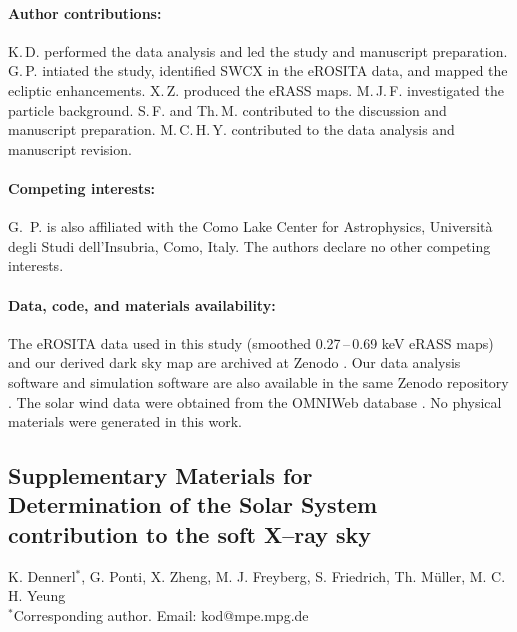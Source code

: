 \documentclass[12pt]{article}
\def\scititle{Determination of the Solar System contribution to the soft X--ray sky}
\begin{document}
\paragraph*{Author contributions:}
K.\,D. performed the data analysis and led the study and manuscript preparation.
G.\,P. intiated the study, identified SWCX in the eROSITA data, and mapped the ecliptic enhancements.
X.\,Z. produced the eRASS maps.
M.\,J.\,F. investigated the particle background.
S.\,F. and Th.\,M. contributed to the discussion and manuscript preparation.
M.\,C.\,H.\,Y. contributed to the data analysis and manuscript revision.

\paragraph*{Competing interests:}
G.~P. is also affiliated with the Como Lake Center for Astrophysics, Università degli Studi dell’Insubria, Como, Italy. The authors declare no other competing interests.

\paragraph*{Data, code, and materials availability:}

The eROSITA data used in this study (smoothed 0.27\,--\,0.69 keV eRASS maps) and our derived dark sky map are archived at Zenodo \cite{zenodo_doi}. Our data analysis software and simulation software are also available in the same Zenodo repository \cite{zenodo_doi}. The solar wind data were obtained from the OMNIWeb database \cite{omniweb}. No physical materials were generated in this work.

\newpage




\renewcommand{\thefigure}{S\arabic{figure}}
\renewcommand{\thetable}{S\arabic{table}}
\renewcommand{\theequation}{S\arabic{equation}}
\renewcommand{\thepage}{S\arabic{page}}
\setcounter{figure}{0}
\setcounter{table}{0}
\setcounter{equation}{0}
\setcounter{page}{1}





\begin{center}
\section*{Supplementary Materials for\\ \quad\scititle}

K. Dennerl$^{\ast}$,
G. Ponti,
X. Zheng,
M. J. Freyberg,
S. Friedrich,
Th. M{\"u}ller,
M. C. H. Yeung\\
\small$^\ast$Corresponding author. Email: kod@mpe.mpg.de\\

\end{center}
\end{document}
